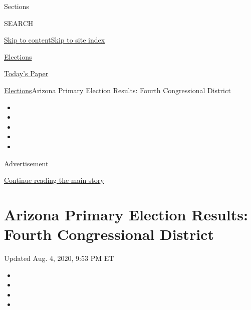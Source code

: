 Sections

SEARCH

\protect\hyperlink{site-content}{Skip to
content}\protect\hyperlink{site-index}{Skip to site index}

\href{https://www.nytimes.com/news-event/2020-election}{Elections}

\href{https://myaccount.nytimes.com/auth/login?response_type=cookie\&client_id=vi}{}

\href{https://www.nytimes.com/section/todayspaper}{Today's Paper}

\href{/news-event/2020-election}{Elections}\textbar{}Arizona Primary
Election Results: Fourth Congressional District

\begin{itemize}
\item
\item
\item
\item
\item
\end{itemize}

Advertisement

\protect\hyperlink{after-top}{Continue reading the main story}

\hypertarget{arizona-primary-election-results-fourth-congressional-district}{%
\section{Arizona Primary Election Results: Fourth Congressional
District}\label{arizona-primary-election-results-fourth-congressional-district}}

Updated Aug. 4, 2020, 9:53 PM ET

\begin{itemize}
\item
\item
\item
\item
\end{itemize}

